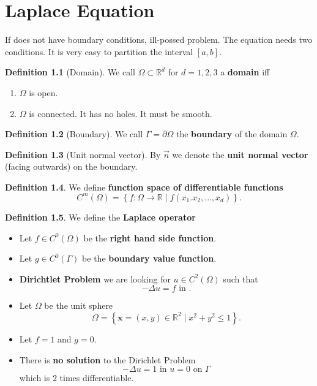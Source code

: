 \documentclass[
	a4paper,
	11pt,
	oneside
]{scrreprt}
\theoremstyle{definition}
\newtheorem{definition}{Definition}
\begin{document}
\chapter{Laplace Equation}

If does not have boundary conditions, ill-possed problem. The equation needs two conditions. It is very easy to partition the interval $\left[a,b\right]$.

\begin{definition}[Domain]
We call $\Omega\subset\mathbb{R}^d$ for $d=1,2,3$ a \textbf{domain} iff
\begin{enumerate}
	\item $\Omega$ is open.
	\item $\Omega$ is connected. It has no holes. It must be smooth.
\end{enumerate}
\end{definition}

\begin{definition}[Boundary]
We call $\Gamma=\partial\Omega$ the \textbf{boundary} of the domain $\Omega$.
\end{definition}

\begin{definition}[Unit normal vector]
By $\vec{n}$ we denote the \textbf{unit normal vector} (facing outwards) on the boundary.
\end{definition}

\begin{definition}
We define \textbf{function space of differentiable functions} \[ C^{m}(\Omega)=\left\{f\colon\Omega\rightarrow\mathbb{R}\mid f\left(x_1.x_2,\ldots, x_d\right)\right\}. \]
\end{definition}

\begin{definition}
We define the \textbf{Laplace operator}
\end{definition}

\begin{itemize}
	\item Let $f\in C^{0}\left(\Omega\right)$ be the \textbf{right hand side function}.
	\item Let $g\in C^{0}\left(\Gamma\right)$ be the \textbf{boundary value function}.
	\item \textbf{Dirichtlet Problem} we are looking for $u\in C^{2}(\Omega)$ such that \[ -\Delta u=f\text{ in }. \]
	\item Let $\Omega$ be the unit sphere \[ \Omega=\left\{\bm{x}=\left(x,y\right)\in\mathbb{R}^{2}\mid x^{2}+y^{2}\le 1\right\}. \]
	\item Let $f=1$ and $g=0$.
	\item There is \textbf{no solution} to the Dirichlet Problem \[-\Delta u=1\text{ in }u=0\text{ on }\Gamma \] which is $2$ times differentiable.
\end{itemize}
\end{document}
